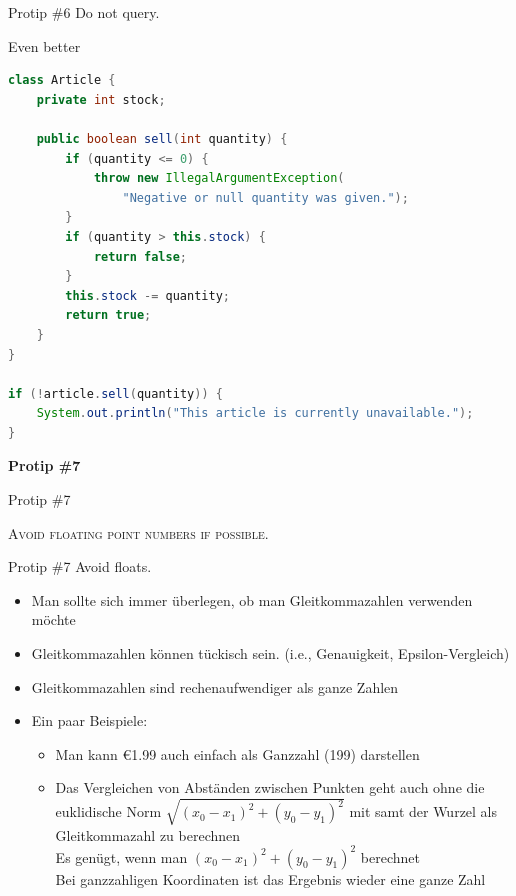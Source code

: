 \documentclass[18pt]{beamer}
\begin{document}
\begin{frame}[fragile]{Protip \#6 Do not query.}
    \begin{block}{Even better}
        \begin{lstlisting}[language=Java,basicstyle=\scriptsize]
class Article {
    private int stock;

    public boolean sell(int quantity) {
        if (quantity <= 0) {
            throw new IllegalArgumentException(
                "Negative or null quantity was given.");
        }
        if (quantity > this.stock) {
            return false;
        }
        this.stock -= quantity;
        return true;
    }
}

if (!article.sell(quantity)) {
    System.out.println("This article is currently unavailable.");
}
        \end{lstlisting}
    \end{block}
\end{frame}

\begin{frame}{\quad}
    \center
    \Huge{\textbf{Protip \#7}}
\end{frame}

\begin{frame}{Protip \#7}
    \begin{block}{}
        \center
        \textsc{Avoid floating point numbers if possible.}
    \end{block}
\end{frame}

\begin{frame}{Protip \#7 Avoid floats.}
    \begin{itemize}
        \item Man sollte sich immer überlegen, ob man Gleitkommazahlen verwenden möchte
        \item Gleitkommazahlen können tü­ckisch sein. (i.e., Genauigkeit, Epsilon-Vergleich)
        \item Gleitkommazahlen sind rechenaufwendiger als ganze Zahlen
        \item Ein paar Beispiele:
        \begin{itemize}
            \item Man kann \euro 1.99 auch einfach als Ganzzahl (199) darstellen
            \item Das Vergleichen von Abständen zwischen Punkten geht auch ohne die euklidische Norm
            $\sqrt{(x_0 - x_1)^2 + (y_0 - y_1)^2}$ mit samt der Wurzel als Gleitkommazahl zu berechnen\\
            Es genügt, wenn man $(x_0 - x_1)^2 + (y_0 - y_1)^2$ berechnet\\
            Bei ganzzahligen Koordinaten ist das Ergebnis wieder eine ganze Zahl
        \end{itemize}
    \end{itemize}
\end{frame}
\end{document}
